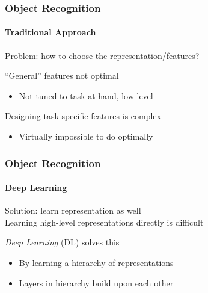 \documentclass[xetex,professionalfont]{beamer}
\begin{document}

\begin{frame}
\frametitle{Object Recognition}
\framesubtitle{Traditional Approach}

Problem: how to choose the representation/features? %

\bigskip
\enquote{General} features not optimal %
\begin{itemize}
	\item Not tuned to task at hand, low-level
\end{itemize}

\bigskip
Designing task-specific features is complex
\begin{itemize}
	\item Virtually impossible to do optimally %
\end{itemize}

\end{frame}


\begin{frame}
\frametitle{Object Recognition}
\framesubtitle{Deep Learning}

Solution: learn representation as well\\\medskip %
Learning high-level representations directly is difficult

\bigskip
\emph{Deep Learning} (DL) solves this
\begin{itemize}
	\item By learning a hierarchy of representations %
	\item Layers in hierarchy build upon each other %
\end{itemize}

\end{frame}

\end{document}
